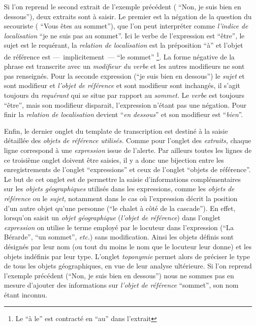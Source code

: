 Si l'on reprend le second extrait de l'exemple précédent (\ie
\enquote{Non, je suis bien en dessous}), deux extraits sont à
saisir. Le premier est la négation de la question du secouriste (\ie
\enquote{Vous êtes au sommet}), que l'on peut interpréter comme
\emph{l'indice de localisation} \enquote{je ne suis pas au
  sommet}. Ici le verbe de l'expression est \enquote{être}, le sujet
est le requérant, la \emph{relation de localisation} est la
préposition \enquote{à} et l'objet de référence est
---~implicitement~--- \enquote{le sommet} \footnote{Le \enquote{à le}
  est contracté en \enquote{au} dans l'extrait}. La forme négative de
la phrase est transcrite avec un \emph{modifieur du verbe} et les
autres modifieurs ne sont pas renseignés. Pour la seconde expression
(\ie \enquote{je suis bien en dessous}) le \emph{sujet} et sont
modifieur et \emph{l'objet de référence} et sont modifieur sont
inchangés, il s'agit toujours du \emph{requérant} qui se situe par
rapport au \emph{sommet.} Le \emph{verbe} est toujours \enquote{être},
mais son modifieur disparait, l'expression n'étant pas une
négation. Pour finir la \emph{relation de localisation} devient
\enquote{\emph{en dessous}} et son modifieur est
\enquote{\emph{bien}}.

Enfin, le dernier onglet du template de transcription est destiné à la
saisie détaillée des \emph{objets de référence utilisés.} Comme pour
l'onglet des \emph{extraits,} chaque ligne correspond à une
\emph{expression} issue de l'alerte. Par ailleurs toutes les lignes de
ce troisième onglet doivent être saisies, il y a donc une bijection
entre les enregistrements de l'onglet \enquote{expressions} et ceux de
l'onglet \enquote{objets de référence}. Le but de cet onglet est de
permettre la saisie d'informations complémentaires sur les
\emph{objets géographiques} utilisés dans les expressions, comme les
\emph{objets de référence} ou le \emph{sujet,} notamment dans le cas
où l'expression décrit la position d'un autre objet qu'une personne
(\eg \enquote{le chalet à côté de la cascade}). En effet, lorsqu'on
saisit un \emph{objet géographique} (\eg \emph{l'objet de référence})
dans l'onglet \emph{expression} on utilise le terme employé par le
locuteur dans l'expression (\eg \enquote{La Bérarde}, \enquote{un
  sommet}, \emph{etc.}) sans modification. Ainsi les objets définis
sont désignés par leur nom (ou tout du moins le nom que le locuteur
leur donne) et les objets indéfinis par leur type. L'onglet
\emph{toponymie} permet alors de préciser le type de tous les objets
géographiques, en vue de leur analyse ultérieure. Si l'on reprend
l'exemple précédent (\ie \enquote{Non, je suis bien en dessous}) nous
ne sommes pas en mesure d'ajouter des informations sur \emph{l'objet
  de référence} \enquote{sommet}, son nom étant inconnu.

